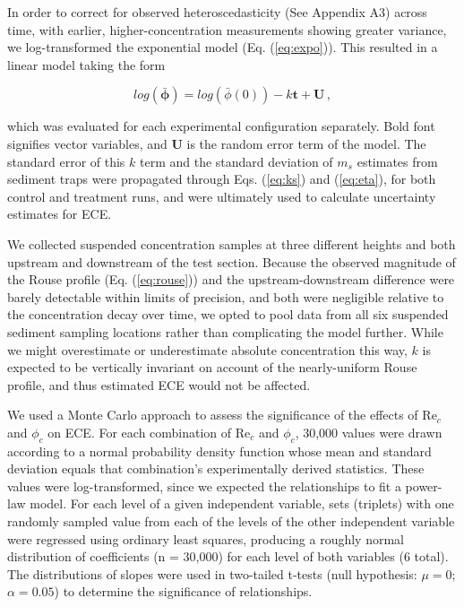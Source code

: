 \documentclass[geosciences,article,submit,moreauthors,pdftex]{Definitions/mdpi}
\newcommand\Rey{\mathrm{Re}}
\begin{document}
In order to correct for observed heteroscedasticity (See Appendix A3) across time, with earlier, higher-concentration measurements showing greater variance, we log-transformed the exponential model (Eq. (\ref{eq:expo})). This resulted in a linear model taking the form

\begin{equation}
    log(\boldsymbol{\bar{\phi}}) = log(\bar{\phi}(0)) - k\boldsymbol{t} + \boldsymbol{U} \,,
\end{equation}

\noindent which was evaluated for each experimental configuration separately. Bold font signifies vector variables, and $\boldsymbol{U}$ is the random error term of the model. The standard error of this $k$ term and the standard deviation of $m_s$ estimates from sediment traps were propagated through Eqs. (\ref{eq:ks}) and (\ref{eq:eta}), for both control and treatment runs, and were ultimately used to calculate uncertainty estimates for ECE.

We collected suspended concentration samples at three different heights and both upstream and downstream of the test section. Because the observed magnitude of the Rouse profile (Eq. (\ref{eq:rouse})) and the upstream-downstream difference were barely detectable within limits of precision, and both were negligible relative to the concentration decay over time, we opted to pool data from all six suspended sediment sampling locations rather than complicating the model further. While we might overestimate or underestimate absolute concentration this way, $k$ is expected to be vertically invariant on account of the nearly-uniform Rouse profile, and thus estimated ECE would not be affected.

We used a Monte Carlo approach to assess the significance of the effects of $\Rey_c$ and $\phi_c$ on ECE. For each combination of $\Rey_c$ and $\phi_c$, 30,000 values were drawn according to a normal probability density function whose mean and standard deviation equals that combination's experimentally derived statistics. These values were log-transformed, since we expected the relationships to fit a power-law model. For each level of a given independent variable, sets (triplets) with one randomly sampled value from each of the levels of the other independent variable were regressed using ordinary least squares, producing a roughly normal distribution of coefficients (n = 30,000) for each level of both variables (6 total). The distributions of slopes were used in two-tailed t-tests (null hypothesis: $\mu = 0$; $\alpha = 0.05$) to determine the significance of relationships.
\end{document}
